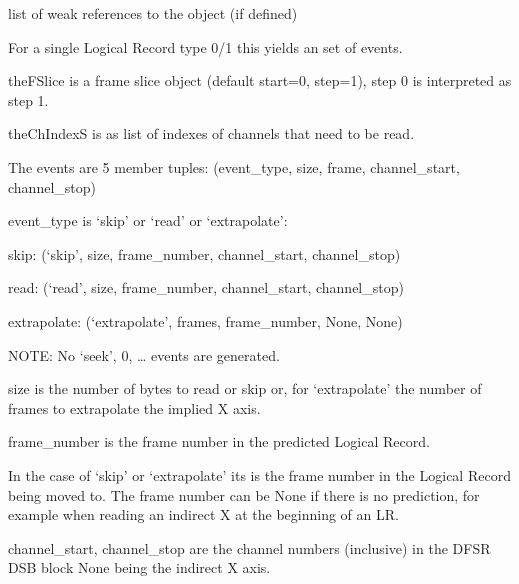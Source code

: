 \documentclass[letterpaper,10pt,english]{sphinxmanual}
\begin{document}
\begin{fulllineitems}
\begin{fulllineitems}
\end{fulllineitems}


\begin{fulllineitems}
\label{\detokenize{ref/LIS/core/Type01Plan:TotalDepth.LIS.core.Type01Plan.FrameSetPlan.__weakref__}}
list of weak references to the object (if defined)

\end{fulllineitems}


\begin{fulllineitems}
\label{\detokenize{ref/LIS/core/Type01Plan:TotalDepth.LIS.core.Type01Plan.FrameSetPlan.genEvents}}
For a single Logical Record type 0/1 this yields an set of events.

theFSlice is a frame slice object (default start=0, step=1), step 0 is interpreted as step 1.

theChIndexS is as list of indexes of channels that need to be read.

The events are 5 member tuples:
(event\_type, size, frame, channel\_start, channel\_stop)

event\_type is ‘skip’ or ‘read’ or ‘extrapolate’:

skip: (‘skip’,        size,   frame\_number, channel\_start, channel\_stop)

read: (‘read’,        size,   frame\_number, channel\_start, channel\_stop)

extrapolate: (‘extrapolate’, frames, frame\_number, None,          None)

NOTE: No ‘seek’, 0, … events are generated.

size is the number of bytes to read or skip or, for ‘extrapolate’ the
number of frames to extrapolate the implied X axis.

frame\_number is the frame number in the predicted Logical Record.

In the case of ‘skip’ or ‘extrapolate’ its is the frame number in the
Logical Record being moved to. The frame number can be None if there
is no prediction, for example when reading an indirect X at the
beginning of an LR.

channel\_start, channel\_stop are the channel numbers (inclusive) in the
DFSR DSB block None being the indirect X axis.


\end{fulllineitems}
\end{fulllineitems}
\end{document}
